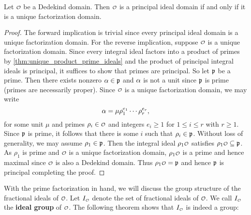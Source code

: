     \begin{proposition}\label{prop:UDF_PID_equivalence_for_Dedekind}
      Let $\smc{O}$ be a Dedekind domain. Then $\smc{O}$ is a principal ideal domain if and only if it is a unique factorization domain.
    \end{proposition}
    \begin{proof}
      The forward implication is trivial since every principal ideal domain is a unique factorization domain. For the reverse implication, suppose $\smc{O}$ is a unique factorization domain. Since every integral ideal factors into a product of primes by \cref{thm:unique_product_prime_ideals} and the product of principal integral ideals is principal, it suffices to show that primes are principal. So let $\mathfrak{p}$ be a prime. Then there exists nonzero $\alpha \in \mathfrak{p}$ and $\alpha$ is not a unit since $\mathfrak{p}$ is prime (primes are necessarily proper). Since $\smc{O}$ is a unique factorization domain, we may write
      \[
        \alpha = \mu\rho_{1}^{e_{1}} \cdots \rho_{r}^{e_{r}},
      \]
      for some unit $\mu$ and primes $\rho_{i} \in \smc{O}$ and integers $e_{i} \ge 1$ for $1 \le i \le r$ with $r \ge 1$. Since $\mathfrak{p}$ is prime, it follows that there is some $i$ such that $\rho_{i} \in \mathfrak{p}$. Without loss of generality, we may assume $\rho_{1} \in \mathfrak{p}$. Then the integral ideal $\rho_{1}\smc{O}$ satisfies $\rho_{1}\smc{O} \subseteq \mf{p}$. As $\rho_{1}$ is prime and $\smc{O}$ is a unique factorization domain, $\rho_{1}\smc{O}$ is a prime and hence maximal since $\smc{O}$ is also a Dedekind domain. Thus $\rho_{1}\smc{O} = \mf{p}$ and hence $\mathfrak{p}$ is principal completing the proof.
    \end{proof}

    With the prime factorization in hand, we will discuss the group structure of the fractional ideals of $\smc{O}$. Let $I_{\smc{O}}$ denote the set of fractional ideals of $\smc{O}$. We call $I_{\smc{O}}$ the \textbf{ideal group} of $\smc{O}$. The following theorem shows that $I_{\smc{O}}$ is indeed a group:

